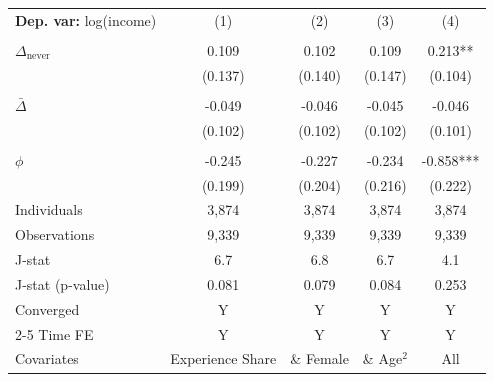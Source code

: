\begin{tabular}{l cccc} \toprule  \textbf{Dep. var:}  log(income) 
                    &\multicolumn{1}{c}{(1)}   &\multicolumn{1}{c}{(2)}   &\multicolumn{1}{c}{(3)}   &\multicolumn{1}{c}{(4)}   \\
                    &               &               &               &               \\
\addlinespace
$\Delta_{\text{never}}$&       0.109   &       0.102   &       0.109   &       0.213** \\
                    &     (0.137)   &     (0.140)   &     (0.147)   &     (0.104)   \\
                    &               &               &               &               \\
\addlinespace
$\bar{\Delta}$      &      -0.049   &      -0.046   &      -0.045   &      -0.046   \\
                    &     (0.102)   &     (0.102)   &     (0.102)   &     (0.101)   \\
                    &               &               &               &               \\
\addlinespace
$\phi$              &      -0.245   &      -0.227   &      -0.234   &      -0.858***\\
                    &     (0.199)   &     (0.204)   &     (0.216)   &     (0.222)   \\
\addlinespace
Individuals         &       3,874   &       3,874   &       3,874   &       3,874   \\
Observations        &       9,339   &       9,339   &       9,339   &       9,339   \\
J-stat              &         6.7   &         6.8   &         6.7   &         4.1   \\
J-stat (p-value)    &       0.081   &       0.079   &       0.084   &       0.253   \\
Converged           &           Y   &           Y   &           Y   &           Y   \\
\cmidrule{2-5} Time FE & Y & Y & Y & Y \\ Covariates & Experience Share & \& Female & \& Age$^2$ & All \\ \bottomrule \end{tabular}

